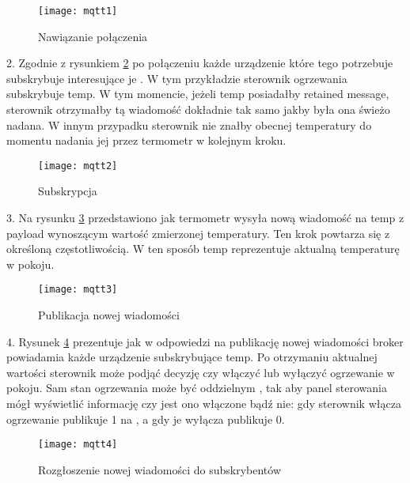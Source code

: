 \begin{figure}[h]
    \centering
    \texttt{[image: mqtt1]}
    \caption{Nawiązanie połączenia}
    \label{fig:mqtt1}
\end{figure}

\vspace{2em}

2. Zgodnie z rysunkiem \ref{fig:mqtt2} po połączeniu każde urządzenie które tego potrzebuje subskrybuje interesujące je . W tym przykładzie sterownik ogrzewania subskrybuje  temp. W tym momencie, jeżeli  temp posiadałby retained message, sterownik otrzymałby tą wiadomość dokładnie tak samo jakby była ona świeżo nadana. W innym przypadku sterownik nie znałby obecnej temperatury do momentu nadania jej przez termometr w kolejnym kroku.\\

\begin{figure}[h]
    \centering
    \texttt{[image: mqtt2]}
    \caption{Subskrypcja}
    \label{fig:mqtt2}
\end{figure}

\newpage

3. Na rysunku \ref{fig:mqtt3} przedstawiono jak termometr wysyła nową wiadomość na  temp z payload wynoszącym wartość zmierzonej temperatury. Ten krok powtarza się z określoną częstotliwością. W ten sposób  temp reprezentuje aktualną temperaturę w pokoju.\\

\begin{figure}[h]
    \centering
    \texttt{[image: mqtt3]}
    \caption{Publikacja nowej wiadomości}
    \label{fig:mqtt3}
\end{figure}

\vspace{2em}

4. Rysunek \ref{fig:mqtt4} prezentuje jak w odpowiedzi na publikację nowej wiadomości broker powiadamia każde urządzenie subskrybujące  temp. Po otrzymaniu aktualnej wartości sterownik może podjąć decyzję czy włączyć lub wyłączyć ogrzewanie w pokoju. Sam stan ogrzewania może być oddzielnym , tak aby panel sterowania mógł wyświetlić informację czy jest ono włączone bądź nie: gdy sterownik włącza ogrzewanie publikuje 1 na  , a gdy je wyłącza publikuje 0.\\

\begin{figure}[h]
    \centering
    \texttt{[image: mqtt4]}
    \caption{Rozgłoszenie nowej wiadomości do subskrybentów}
    \label{fig:mqtt4}
\end{figure}

